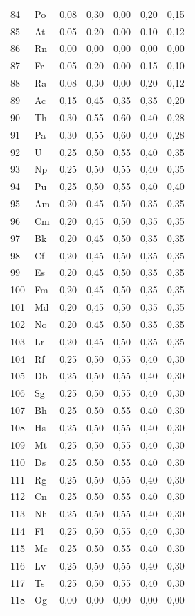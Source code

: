 \documentclass[12pt,a4paper]{article}
\begin{document}
\begin{longtable}{p{2.2cm}p{1.2cm}p{2.2cm}p{2.2cm}p{2.2cm}p{2.2cm}p{2.2cm}}
	84 & Po  & 0,08 & 0,30 & 0,00 & 0,20 & 0,15 \\
	85 & At  & 0,05 & 0,20 & 0,00 & 0,10 & 0,12 \\
	86 & Rn  & 0,00 & 0,00 & 0,00 & 0,00 & 0,00 \\
	87 & Fr  & 0,05 & 0,20 & 0,00 & 0,15 & 0,10 \\
	88 & Ra  & 0,08 & 0,30 & 0,00 & 0,20 & 0,12 \\
	89 & Ac  & 0,15 & 0,45 & 0,35 & 0,35 & 0,20 \\
	90 & Th  & 0,30 & 0,55 & 0,60 & 0,40 & 0,28 \\
	91 & Pa  & 0,30 & 0,55 & 0,60 & 0,40 & 0,28 \\
	92 & U   & 0,25 & 0,50 & 0,55 & 0,40 & 0,35 \\
	93 & Np  & 0,25 & 0,50 & 0,55 & 0,40 & 0,35 \\
	94 & Pu  & 0,25 & 0,50 & 0,55 & 0,40 & 0,40 \\
	95 & Am  & 0,20 & 0,45 & 0,50 & 0,35 & 0,35 \\
	96 & Cm  & 0,20 & 0,45 & 0,50 & 0,35 & 0,35 \\
	97 & Bk  & 0,20 & 0,45 & 0,50 & 0,35 & 0,35 \\
	98 & Cf  & 0,20 & 0,45 & 0,50 & 0,35 & 0,35 \\
	99 & Es  & 0,20 & 0,45 & 0,50 & 0,35 & 0,35 \\
	100& Fm  & 0,20 & 0,45 & 0,50 & 0,35 & 0,35 \\
	101& Md  & 0,20 & 0,45 & 0,50 & 0,35 & 0,35 \\
	102& No  & 0,20 & 0,45 & 0,50 & 0,35 & 0,35 \\
	103& Lr  & 0,20 & 0,45 & 0,50 & 0,35 & 0,35 \\
	104& Rf  & 0,25 & 0,50 & 0,55 & 0,40 & 0,30 \\
	105& Db  & 0,25 & 0,50 & 0,55 & 0,40 & 0,30 \\
	106& Sg  & 0,25 & 0,50 & 0,55 & 0,40 & 0,30 \\
	107& Bh  & 0,25 & 0,50 & 0,55 & 0,40 & 0,30 \\
	108& Hs  & 0,25 & 0,50 & 0,55 & 0,40 & 0,30 \\
	109& Mt  & 0,25 & 0,50 & 0,55 & 0,40 & 0,30 \\
	110& Ds  & 0,25 & 0,50 & 0,55 & 0,40 & 0,30 \\
	111& Rg  & 0,25 & 0,50 & 0,55 & 0,40 & 0,30 \\
	112& Cn  & 0,25 & 0,50 & 0,55 & 0,40 & 0,30 \\
	113& Nh  & 0,25 & 0,50 & 0,55 & 0,40 & 0,30 \\
	114& Fl  & 0,25 & 0,50 & 0,55 & 0,40 & 0,30 \\
	115& Mc  & 0,25 & 0,50 & 0,55 & 0,40 & 0,30 \\
	116& Lv  & 0,25 & 0,50 & 0,55 & 0,40 & 0,30 \\
	117& Ts  & 0,25 & 0,50 & 0,55 & 0,40 & 0,30 \\
	118& Og  & 0,00 & 0,00 & 0,00 & 0,00 & 0,00 \\
	\bottomrule
\end{longtable}
\end{document}
